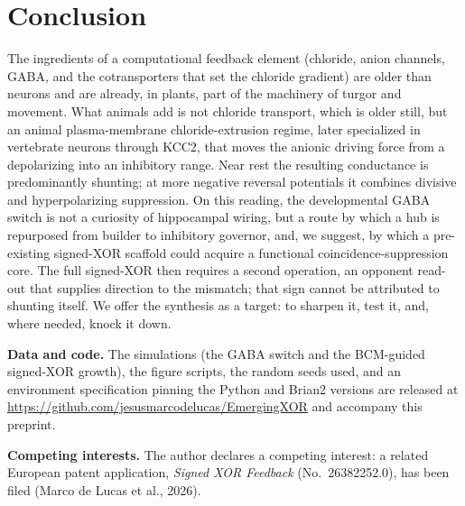 \documentclass[11pt,a4paper]{article}
\begin{document}
\section{Conclusion}\label{sec:concl}
The ingredients of a computational feedback element (chloride, anion channels, GABA, and the cotransporters that set the chloride gradient) are older than neurons and are already, in plants, part of the machinery of turgor and movement. What animals add is not chloride transport, which is older still, but an animal plasma-membrane chloride-extrusion regime, later specialized in vertebrate neurons through KCC2, that moves the anionic driving force from a depolarizing into an inhibitory range. Near rest the resulting conductance is predominantly shunting; at more negative reversal potentials it combines divisive and hyperpolarizing suppression. On this reading, the developmental GABA switch is not a curiosity of hippocampal wiring, but a route by which a hub is repurposed from builder to inhibitory governor, and, we suggest, by which a pre-existing signed-XOR scaffold could acquire a functional coincidence-suppression core. The full signed-XOR then requires a second operation, an opponent read-out that supplies direction to the mismatch; that sign cannot be attributed to shunting itself. We offer the synthesis as a target: to sharpen it, test it, and, where needed, knock it down.

\vspace{0.4em}
\noindent\textbf{Data and code.} The simulations (the GABA switch and the BCM-guided signed-XOR growth), the figure scripts, the random seeds used, and an environment specification pinning the Python and Brian2 versions are released at \url{https://github.com/jesusmarcodelucas/EmergingXOR} and accompany this preprint.

\vspace{0.2em}
\noindent\textbf{Competing interests.} The author declares a competing interest: a related European patent application, \emph{Signed XOR Feedback} (No.~26382252.0), has been filed (Marco de Lucas et al., 2026).

\FloatBarrier
\appendix
{}
\titlespacing{\section}{0pt}{1.2em}{0.4em}
\end{document}
